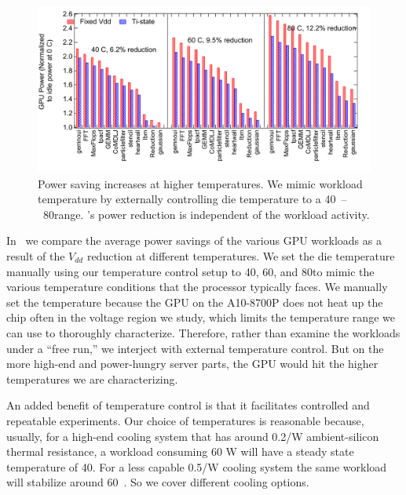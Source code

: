 \begin{figure}
  \centering
  \includegraphics[trim=0 0 0 0,clip,width=\linewidth]{graphs/temperature/evaluate-tistate.pdf}
  \caption{Power saving increases at higher temperatures. We mimic workload temperature by externally controlling die temperature to a 40\C~--~80\C range. \tistate's power reduction is independent of the workload activity. }
  \label{fig:power-save-orig}
\end{figure}

In~ we compare the average power savings of the various GPU workloads as a result of the $V_{dd}$ reduction at different temperatures. We set the die temperature manually using our temperature control setup to 40\C, 60\C, and 80\C to mimic the various temperature conditions that the processor typically faces. We manually set the temperature because the GPU on the A10-8700P does not heat up the chip often in the voltage region we study, which limits the temperature range we can use to thoroughly characterize. Therefore, rather than examine the workloads under a ``free run,'' we interject with external temperature control. But on the more high-end and power-hungry server parts, the GPU would hit the higher temperatures we are characterizing.

An added benefit of temperature control is that it facilitates controlled and repeatable experiments. Our choice of temperatures is reasonable because, usually, for a high-end cooling system that has around 0.2\C/W ambient-silicon thermal resistance, a workload consuming 60 W will have a steady state temperature of 40\C. For a less capable 0.5\C/W cooling system the same workload will stabilize around 60\C~\cite{skadron2004temperature,huang2006hotspot,fan2016computational}. So we cover different cooling options.

